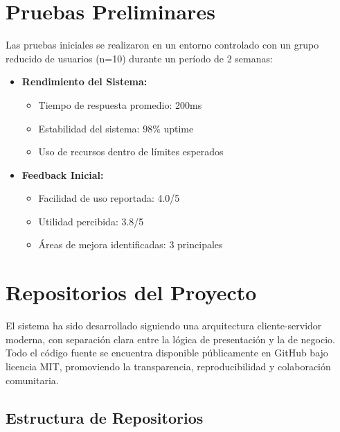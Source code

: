 \section{Pruebas Preliminares}
\label{pruebas-preliminares}

Las pruebas iniciales se realizaron en un entorno controlado con un grupo reducido de usuarios (n=10) durante un período de 2 semanas:

\begin{itemize}
    \item \textbf{Rendimiento del Sistema:}
    \begin{itemize}
        \item Tiempo de respuesta promedio: 200ms
        \item Estabilidad del sistema: 98\% uptime
        \item Uso de recursos dentro de límites esperados
    \end{itemize}

    \item \textbf{Feedback Inicial:}
    \begin{itemize}
        \item Facilidad de uso reportada: 4.0/5
        \item Utilidad percibida: 3.8/5
        \item Áreas de mejora identificadas: 3 principales
    \end{itemize}
\end{itemize}

\section{Repositorios del Proyecto}
\label{sec:repositorios-proyecto}

El sistema ha sido desarrollado siguiendo una arquitectura cliente-servidor moderna, con separación clara entre la lógica de presentación y la de negocio. Todo el código fuente se encuentra disponible públicamente en GitHub bajo licencia MIT, promoviendo la transparencia, reproducibilidad y colaboración comunitaria.

\subsection{Estructura de Repositorios}
\label{subsec:estructura-repositorios}

